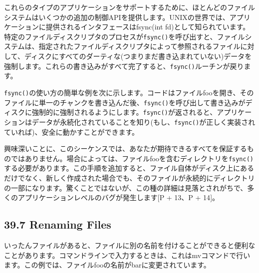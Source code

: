 これらのタイプのアプリケーションをサポートするために、ほとんどのファイルシステムはいくつかの追加の制御APIを提供します。UNIXの世界では、アプリケーションに提供されるインタフェースはfsync(int
fd)として知られています。特定のファイルディスクリプタのプロセスが\texttt{fsync()}を呼び出すと、ファイルシステムは、指定されたファイルディスクリプタによって参照されるファイルに対して、ディスクにすべてのダーティな(つまりまだ書き込まれていない)データを強制します。これらの書き込みがすべて完了すると、\texttt{fsync()}ルーチンが戻ります。

\texttt{fsync()}の使い方の簡単な例を次に示します。コードはファイルfooを開き、そのファイルに単一のチャンクを書き込んだ後、\texttt{fsync()}を呼び出して書き込みがディスクに強制的に強制されるようにします。\texttt{fsync()}が返されると、アプリケーションはデータが永続化されていることを知り(もし、\texttt{fsync()}が正しく実装されていれば)、安全に動かすことができます。

\begin{Shaded}
\begin{Highlighting}[]
\NormalTok{);}
\NormalTok{);}
\end{Highlighting}
\end{Shaded}

興味深いことに、このシーケンスでは、あなたが期待できるすべてを保証するものではありません。場合によっては、ファイルfooを含むディレクトリを\texttt{fsync()}する必要があります。この手順を追加すると、ファイル自体がディスク上にあるだけでなく、新しく作成された場合でも、そのファイルが永続的にディレクトリの一部になります。驚くことではないが、この種の詳細は見落とされがちで、多くのアプリケーションレベルのバグが発生します{[}P
+ 13、P + 14{]}。

\hypertarget{renaming-files}{%
\subsection*{39.7 Renaming Files}\label{renaming-files}}

いったんファイルがあると、ファイルに別の名前を付けることができると便利なことがあります。コマンドラインで入力するときは、これはmvコマンドで行います。この例では、ファイルfooの名前がbarに変更されています。

